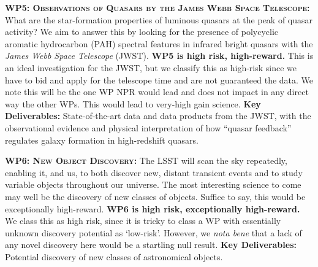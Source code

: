 \documentclass[oneside, a4paper, onecolumn, 11pt]{article}
\begin{document}
\smallskip
\smallskip
\noindent
\textbf{\textsc{WP5: Observations of Quasars by the James Webb Space Telescope:}} 
What are the star-formation properties of %
luminous quasars at the peak of quasar activity?  We aim to answer this by
looking for the presence of polycyclic aromatic hydrocarbon (PAH)
spectral features in 
infrared bright quasars with the
{\it James Webb Space Telescope} (JWST).  {\bf WP5 is high risk,
high-reward.}  This is an ideal investigation for the JWST, but we
classify this as high-risk since we have to bid and apply for the
telescope time and are not guaranteed the data. 
We note this will be the one WP NPR would lead 
and does not impact in any direct way the other WPs. This would lead to very-high gain science.  {\bf Key Deliverables:}
State-of-the-art data and data products from the JWST, with the
observational evidence and physical interpretation of how ``quasar
feedback'' regulates galaxy formation in high-redshift quasars. 


\smallskip
\smallskip
\noindent
\textbf{\textsc{WP6: New Object Discovery:}} 
The LSST will scan the sky repeatedly, enabling it, and us, to both
discover new, distant transient events and to study variable objects
throughout our universe. The most interesting science to come may well
be the discovery of new classes of objects. Suffice to say, this would be exceptionally high-reward. 
{\bf WP6 is high risk, exceptionally high-reward.}
We class this as high risk, since it is tricky to class a WP
with essentially unknown discovery potential as `low-risk'.
However, we {\it nota bene} that a lack of any novel discovery here would 
be a startling null result.  
{\bf Key Deliverables:} Potential discovery of new classes of astronomical objects. 
\end{document}
